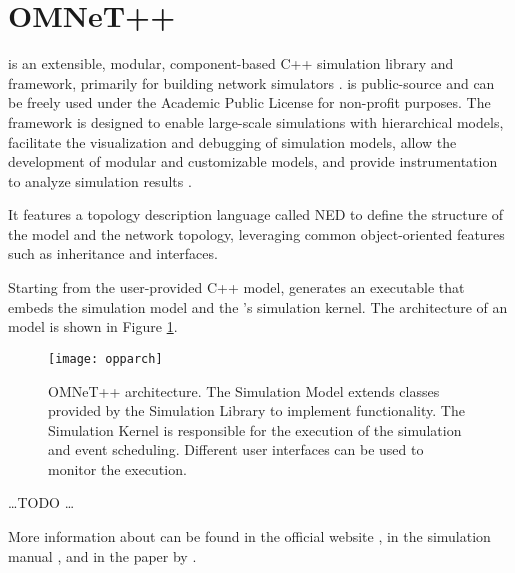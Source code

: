 \section{OMNeT++}\label{sec:omnetpp}

\omnetpp{} is an extensible, modular, component-based C++ simulation library
and framework, primarily for building network simulators
\cite{omnetpp-simulation-manual}. \omnetpp{} is public-source and can be freely
used under the Academic Public License for non-profit purposes. The framework
is designed to enable large-scale simulations with hierarchical models,
facilitate the visualization and debugging of simulation models, allow the
development of modular and customizable models, and provide instrumentation to
analyze simulation results \cite{omnetpp}.

It features a topology description language called NED to define the structure
of the model and the network topology, leveraging common object-oriented
features such as inheritance and interfaces.

Starting from the user-provided C++ model, \omnetpp{} generates an executable
that embeds the simulation model and the \omnetpp{}'s simulation kernel. The
architecture of an \omnetpp{} model is shown in Figure
\ref{fig:omnetpp-architecture}.

\begin{figure}[tbhp]
	\centering
	\texttt{[image: opparch]}
	\caption{OMNeT++ architecture. The Simulation Model extends classes
	provided by the Simulation Library to implement functionality. The
	Simulation Kernel is responsible for the execution of the simulation
	and event scheduling. Different user interfaces can be used to monitor
	the execution.}\label{fig:omnetpp-architecture}
\end{figure}

\ldots TODO \ldots

More information about \omnetpp{} can be found in the official website
\cite{omnetpp-website}, in the simulation manual
\cite{omnetpp-simulation-manual}, and in the paper by \citeauthor{omnetpp}
\cite{omnetpp}.
